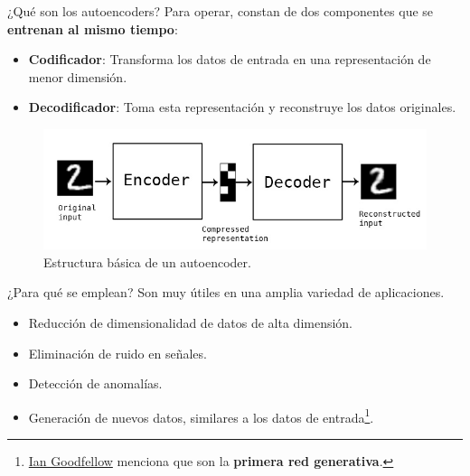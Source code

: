 \begin{frame}{¿Qué son los autoencoders?}
Para operar, constan de dos componentes que se \textbf{entrenan al mismo tiempo}:

\begin{itemize}
    \item \textbf{Codificador}: Transforma los datos de entrada en una representación de menor dimensión.
    \item \textbf{Decodificador}: Toma esta representación y reconstruye los datos originales.
\end{itemize}

\begin{figure}
    \centering
    \includegraphics[width=.7\textwidth]{Slides/figures/02_Metodos_Generativos/cnn-ae.jpg}
    \caption{Estructura básica de un autoencoder.}
\end{figure}
\end{frame}

\begin{frame}{¿Para qué se emplean?}
Son muy útiles en una amplia variedad de aplicaciones.

\begin{itemize}
    \item Reducción de dimensionalidad de datos de alta dimensión.
    \item Eliminación de ruido en señales.
    \item Detección de anomalías.
    \item Generación de nuevos datos, similares a los datos de entrada\footnote{\href{https://scholar.google.es/citations?hl=es&user=iYN86KEAAAAJ}{Ian Goodfellow} menciona que son la \textbf{primera red generativa}.}.
\end{itemize}
\end{frame}


